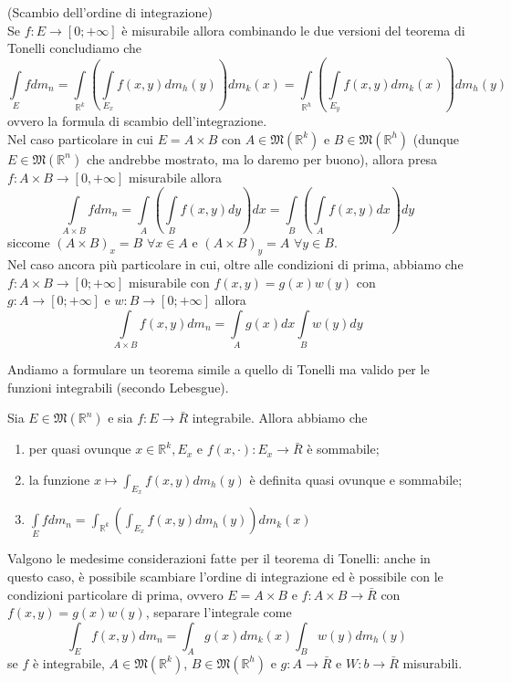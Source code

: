 \begin{remark}(Scambio dell'ordine di integrazione) \\
Se $f: E \to [0; +\infty]$ è misurabile allora combinando le due versioni del teorema di Tonelli concludiamo che
$$
	\int\limits_E fdm_n = \int\limits_{\mathbb{R}^k} \left( \int\limits_{E_x} f(x,y)dm_h(y) \right)dm_k(x) = \int\limits_{\mathbb{R}^h} \left( \int\limits_{E_y} f(x, y)dm_k(x) \right) dm_h(y)
$$
ovvero la formula di scambio dell'integrazione. \\
Nel caso particolare in cui $E = A \times B$ con $A \in \mathfrak{M}(\mathbb{R}^k)$ e $B \in \mathfrak{M}(\mathbb{R}^h)$ (dunque $E \in \mathfrak{M}(\mathbb{R}^n)$ che andrebbe mostrato, ma lo daremo per buono), allora presa $f: A \times B \to [0, +\infty]$ misurabile allora
$$\int\limits_{A \times B} fdm_n = \int\limits_A \left(\int\limits_B f(x, y)dy\right)dx = \int\limits_B \left(\int\limits_A f(x, y)dx\right)dy$$ 
siccome $(A \times B)_x = B \, \, \forall x \in A$ e $(A \times B)_y = A \, \, \forall y \in B$. \\
Nel caso ancora più particolare in cui, oltre alle condizioni di prima, abbiamo che $f: A \times B \to [0; +\infty]$ misurabile con $f(x, y) = g(x)w(y)$ con $g: A \to [0; +\infty]$ e $w: B \to [0;+\infty]$ allora
$$
\int\limits_{A \times B} f(x,y)dm_n = \int\limits_A g(x)dx \int\limits_B w(y)dy
$$
\end{remark}
Andiamo a formulare un teorema simile a quello di Tonelli ma valido per le funzioni integrabili (secondo Lebesgue).
\begin{theorem}
	Sia $E \in \mathfrak{M}(\mathbb{R}^n)$ e sia $f: E \to \bar{R}$ integrabile. Allora abbiamo che
	\begin{enumerate}[label=\protect\circled{\arabic*}]
		\item per quasi ovunque $x \in \mathbb{R}^k, E_x$ e $f(x, \cdot): E_x \to \bar{R}$ è sommabile;
		\item la funzione $x \mapsto \int_{E_x} f(x, y)dm_h(y)$ è definita quasi ovunque e sommabile;
		\item $\int\limits_E fdm_n = \int_{\mathbb{R}^k} \left( \int_{E_x} f(x, y)dm_h(y) \right) dm_k(x)$ 
	\end{enumerate}
\end{theorem}
\begin{remark}
	Valgono le medesime considerazioni fatte per il teorema di Tonelli: anche in questo caso, è possibile scambiare l'ordine di integrazione
	ed è possibile con le condizioni particolare di prima, ovvero $E=A \times B$ e $f: A \times B \to \bar{R}$ con $f(x, y) = g(x)w(y)$, separare l'integrale come
	$$
	\int_E f(x, y)dm_n = \int_A g(x)dm_k(x) \int_B w(y)dm_h(y)
	$$
	se $f$ è integrabile, $A \in \mathfrak{M}(\mathbb{R}^k)$, $B \in \mathfrak{M}(\mathbb{R}^h)$ e $g: A \to \bar{R}$ e $W: b \to \bar{R}$ misurabili.
\end{remark}
